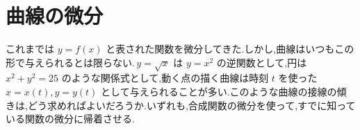 \section{曲線の微分}\label{節:逆媒介陰微分}
これまでは $y=f(x)$ と表された関数を微分してきた.しかし,曲線はいつもこの形で与えられるとは限らない.\,$y=\sqrt x$ は $y=x^2$ の逆関数として,円は $x^2+y^2=25$ のような関係式として,動く点の描く曲線は時刻 $t$ を使った $x=x(t)$,\,$y=y(t)$ として与えられることが多い.このような曲線の接線の傾きは,どう求めればよいだろうか.いずれも,合成関数の微分を使って,すでに知っている関数の微分に帰着させる.
%
%
%
